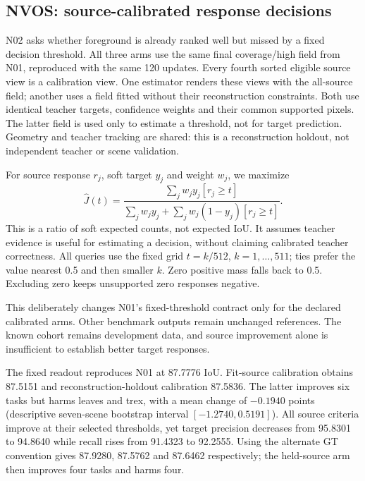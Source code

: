 \subsection{NVOS: source-calibrated response decisions}
N02 asks whether foreground is already ranked well but missed by a fixed
decision threshold. All three arms use the same final coverage/high field from
N01, reproduced with the same 120 updates. Every fourth sorted eligible source
view is a calibration view. One estimator renders these views with the all-source
field; another uses a field fitted without their reconstruction constraints.
Both use identical teacher targets, confidence weights and their common supported
pixels. The latter field is used only to estimate a threshold, not for target
prediction. Geometry and teacher tracking are shared: this is a reconstruction
holdout, not independent teacher or scene validation.

For source response $r_j$, soft target $y_j$ and weight $w_j$, we maximize
\begin{equation}
\widehat J(t)=\frac{\sum_j w_j y_j [r_j\geq t]}
{\sum_j w_j y_j+\sum_j w_j(1-y_j)[r_j\geq t]}.
\end{equation}
This is a ratio of soft expected counts, not expected IoU. It assumes teacher
evidence is useful for estimating a decision, without claiming calibrated
teacher correctness. All queries use the fixed grid $t=k/512$, $k=1,\ldots,511$;
ties prefer the value nearest 0.5 and then smaller $k$. Zero positive mass falls
back to 0.5. Excluding zero keeps unsupported zero responses negative.

\begin{table}[ht]
\centering\small
\resizebox{\linewidth}{!}{}
\caption{Same NVOS continuous field, three decision rules. Thresholds are
estimated from source evidence before any target labels are read. All eight
responses and 24 decisions are sealed jointly. Continuous-response AP is
unchanged across these arms; no per-task winning rule is selected.}
\label{tab:nvos-source-readout}
\end{table}

This deliberately changes N01's fixed-threshold contract only for the declared
calibrated arms. Other benchmark outputs remain unchanged references. The known
cohort remains development data, and source improvement alone is insufficient
to establish better target responses.

The fixed readout reproduces N01 at 87.7776 IoU. Fit-source calibration obtains
87.5151 and reconstruction-holdout calibration 87.5836. The latter improves six
tasks but harms leaves and trex, with a mean change of $-0.1940$ points
(descriptive seven-scene bootstrap interval $[-1.2740,0.5191]$). All source
criteria improve at their selected thresholds, yet target precision decreases
from 95.8301 to 94.8640 while recall rises from 91.4323 to 92.2555.
Using the alternate GT convention gives 87.9280, 87.5762 and 87.6462 respectively;
the held-source arm then improves four tasks and harms four.

